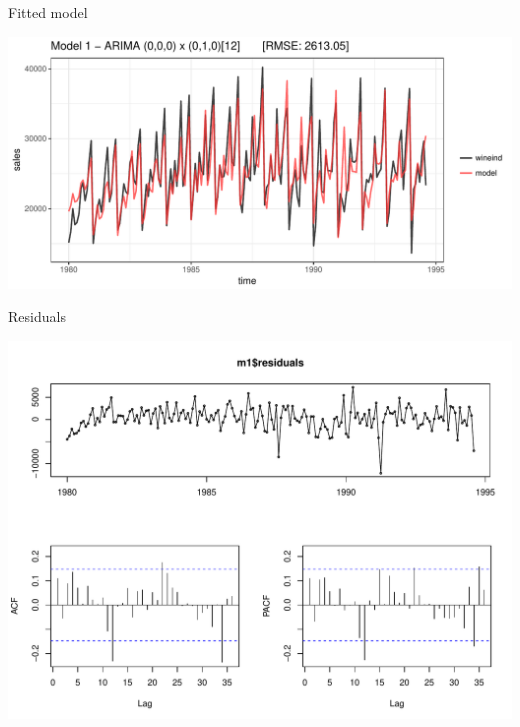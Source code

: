 \documentclass[11pt,ignorenonframetext,]{beamer}
\begin{document}
\begin{frame}{Fitted model}

\includegraphics{Lec11_files/figure-beamer/unnamed-chunk-4-1.pdf}

\end{frame}

\begin{frame}{Residuals}

\includegraphics{Lec11_files/figure-beamer/unnamed-chunk-5-1.pdf}

\end{frame}
\end{document}
